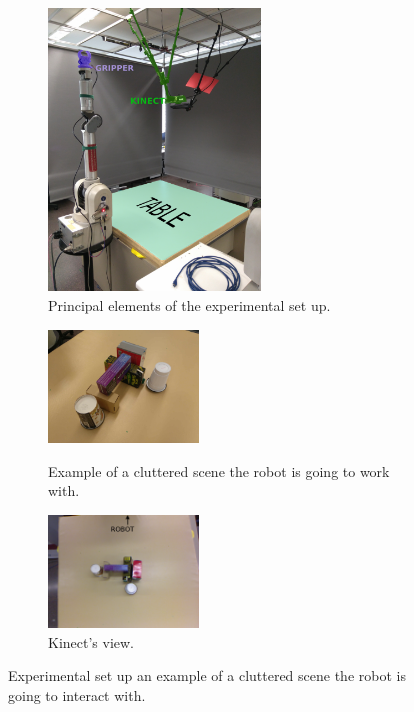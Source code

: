 \begin{figure}[htp]
\centering
\begin{subfigure}[b]{0.4\textwidth}
\includegraphics[height=7.5cm]{Img/set_up/set_up_nice2.png}
\caption{Principal elements of the experimental set up.}\label{fig:setup_}
\end{subfigure}
\qquad \qquad 
\begin{subfigure}[b]{0.4\textwidth}
\centering
\includegraphics[height=3cm]{Img/set_up/example_setup.jpg}
\caption{Example of a cluttered scene the robot is going to work with.}\label{fig:example_scene}
\vspace{2ex}
\includegraphics[height=3cm]{Img/set_up/view_kinect.png}
\caption{Kinect's view.}\label{fig:kinect_view}
\end{subfigure}
\caption{Experimental set up an example of a cluttered scene the robot is going to interact with.}
\label{fig:setup}
\end{figure}





